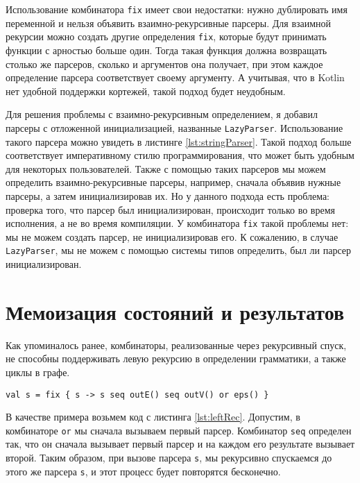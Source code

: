 Использование комбинатора \texttt{fix} имеет свои недостатки: нужно дублировать имя переменной и нельзя объявить взаимно-рекурсивные парсеры. Для взаимной рекурсии можно создать другие определения \texttt{fix}, которые будут принимать функции с арностью больше один. Тогда такая функция должна возвращать столько же парсеров, сколько и аргументов она получает, при этом каждое определение парсера соответствует своему аргументу. А учитывая, что в Kotlin нет удобной поддержки кортежей, такой подход будет неудобным.

Для решения проблемы с взаимно-рекурсивным определением, я добавил парсеры с отложенной инициализацией, названные \texttt{LazyParser}. Использование такого парсера можно увидеть в листинге \ref{lst:stringParser}. Такой подход больше соответствует императивному стилю программирования, что может быть удобным для некоторых пользователей. Также с помощью таких парсеров мы можем определить взаимно-рекурсивные парсеры, например, сначала объявив нужные парсеры, а затем инициализировав их. Но у данного подхода есть проблема: проверка того, что парсер был инициализирован, происходит только во время исполнения, а не во время компиляции. У комбинатора \texttt{fix} такой проблемы нет: мы не можем создать парсер, не инициализировав его. К сожалению, в случае \texttt{LazyParser}, мы не можем с помощью системы типов определить, был ли парсер инициализирован.





\section{Мемоизация состояний и результатов}

Как упоминалось ранее, комбинаторы, реализованные через рекурсивный спуск, не способны поддерживать левую рекурсию в определении грамматики, а также циклы в графе.

\begin{lstlisting}[float=ht, label=lst:leftRec, caption=Пример левой рекурсии в грамматике]
    val s = fix { s -> s seq outE() seq outV() or eps() }
\end{lstlisting}

В качестве примера возьмем код с листинга \ref{lst:leftRec}. Допустим, в комбинаторе \texttt{or} мы сначала вызываем первый парсер. Комбинатор \texttt{seq} определен так, что он сначала вызывает первый парсер и на каждом его результате вызывает второй. Таким образом, при вызове парсера \texttt{s}, мы рекурсивно спускаемся до этого же парсера \texttt{s}, и этот процесс будет повторятся бесконечно.

